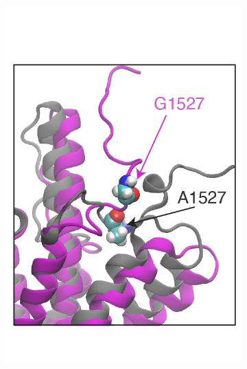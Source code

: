 \documentclass[12pt]{article}
\begin{document}
\begin{figure}[H]
\begin{subfigure}[t]{0.165\textwidth}
    \includegraphics[width=\textwidth]{../../paper/main_plots/abca7_inset_only.png}        
\end{subfigure}
    \begin{subfigure}[t]{0.16\textwidth}
        \caption{}

\end{subfigure}
\end{figure}
\end{document}
